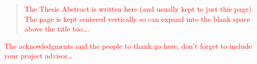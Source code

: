 \documentclass[
11pt, %
english, %
singlespacing, %
parskip, %
headsepline, %
dvipsnames]{misc/MastersDoctoralThesis} %
\theoremstyle{definition}
\newcommand\todo[1]{\textcolor{red}{#1}}
\begin{document}


\begin{abstract}
	\addchaptertocentry{\abstractname} %
	\todo{The Thesis Abstract is written here (and usually kept to just this page). The page is kept centered vertically so can expand into the blank space above the title too\ldots.}
\end{abstract}


\begin{acknowledgements}
	\addchaptertocentry{\acknowledgementname} %
	\todo{The acknowledgments and the people to thank go here, don't forget to include your project advisor\ldots}
\end{acknowledgements}


\tableofcontents %

\listoffigures %

\listoftables %






\end{document}
